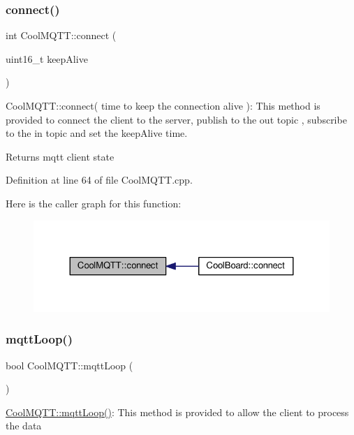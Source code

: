 \subsubsection{\texorpdfstring{connect()}{connect()}}
{\footnotesize\ttfamily int Cool\+M\+Q\+T\+T\+::connect (\begin{DoxyParamCaption}\item[{uint16\+\_\+t}]{keep\+Alive }\end{DoxyParamCaption})}

Cool\+M\+Q\+T\+T\+::connect( time to keep the connection alive )\+: This method is provided to connect the client to the server, publish to the out topic , subscribe to the in topic and set the keep\+Alive time.

\begin{DoxyReturn}{Returns}
mqtt client state 
\end{DoxyReturn}


Definition at line 64 of file Cool\+M\+Q\+T\+T.\+cpp.

Here is the caller graph for this function\+:\nopagebreak
\begin{figure}[H]
\begin{center}
\leavevmode
\includegraphics[width=324pt]{class_cool_m_q_t_t_a58b0b1f64b269c2681685208262fba1d_icgraph}
\end{center}
\end{figure}
\mbox{\label{class_cool_m_q_t_t_aa5eaae967b562b62cbcf2b8d81f6e5d5}} 
\subsubsection{\texorpdfstring{mqtt\+Loop()}{mqttLoop()}}
{\footnotesize\ttfamily bool Cool\+M\+Q\+T\+T\+::mqtt\+Loop (\begin{DoxyParamCaption}{ }\end{DoxyParamCaption})}

\hyperlink{class_cool_m_q_t_t_aa5eaae967b562b62cbcf2b8d81f6e5d5}{Cool\+M\+Q\+T\+T\+::mqtt\+Loop()}\+: This method is provided to allow the client to process the data

